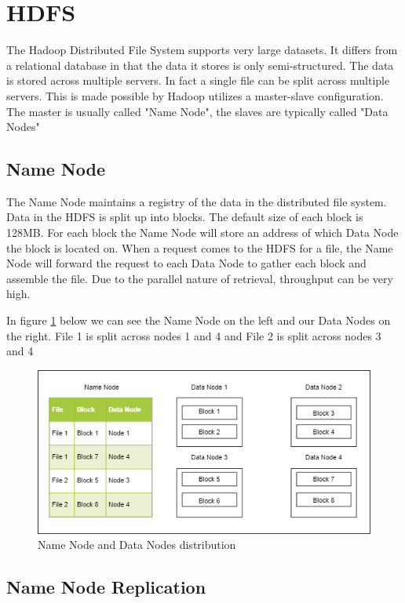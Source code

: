 \section{HDFS}

The Hadoop Distributed File System supports very large datasets. It differs from a relational database in that the data it stores is only semi-structured. The data is stored across multiple servers. In fact a single file can be split across multiple servers. This is made possible by Hadoop utilizes a master-slave configuration. The master is usually called "Name Node", the slaves are typically called "Data Nodes"

\subsection{Name Node}

The Name Node maintains a registry of the data in the distributed file system. Data in the HDFS is split up into blocks. The default size of each block is 128MB. For each block the Name Node will store an address of which Data Node the block is located on. When a request comes to the HDFS for a file, the Name Node will forward the request to each Data Node to gather each block and assemble the file. Due to the parallel nature of retrieval, throughput can be very high.

In figure \ref{fig:name-node} below we can see the Name Node on the left and our Data Nodes on the right. File 1 is split across nodes 1 and 4 and File 2 is split across nodes 3 and 4

\begin{figure}[H]
  \includegraphics[width=\linewidth]{./images/name-node-data-node.png}
  \caption{Name Node and Data Nodes distribution}
  \label{fig:name-node}
\end{figure}

\subsection{Name Node Replication}

